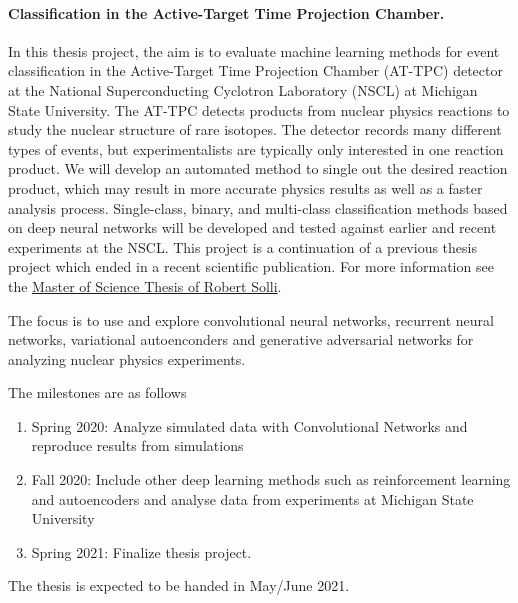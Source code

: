 \documentclass[%
oneside,                 %
final,                   %
10pt]{article}
\begin{document}
\paragraph{Classification in the Active-Target Time Projection Chamber.}
In this thesis project, the aim is to evaluate machine learning methods for
event classification in the Active-Target Time Projection Chamber
(AT-TPC) detector at the National Superconducting Cyclotron Laboratory
(NSCL) at Michigan State University. The AT-TPC detects products from
nuclear physics reactions to study the nuclear structure of rare
isotopes. The detector records many different types of events, but
experimentalists are typically only interested in one reaction
product. We will develop an automated method to single out the desired
reaction product, which may result in more accurate physics results as
well as a faster analysis process. Single-class, binary, and
multi-class classification methods based on deep neural networks will
be developed and tested against earlier and recent experiments at the
NSCL.  This project is a continuation of a previous thesis project which ended in a recent scientific publication.
For more information see the \href{{https://github.com/copperwire/thesis/blob/master/main.pdf}}{Master of Science Thesis of Robert Solli}.


The focus is to  use and explore convolutional neural networks, recurrent neural networks, variational
autoenconders and generative adversarial networks for analyzing nuclear physics experiments.



The milestones are as follows

\begin{enumerate}
\item Spring 2020: Analyze simulated data with Convolutional Networks and reproduce results from simulations

\item Fall 2020: Include other deep learning methods such as reinforcement learning and autoencoders and analyse data from experiments at Michigan State University

\item Spring 2021: Finalize thesis project.
\end{enumerate}

\noindent
The thesis is expected to be handed in May/June  2021.





































\end{document}
